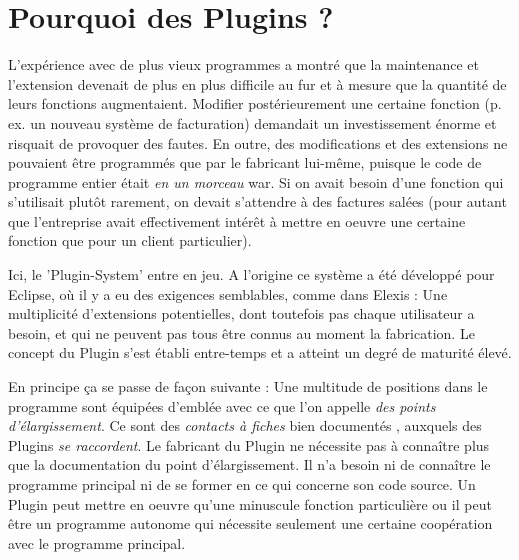 
\section{Pourquoi des Plugins ?}
\label{expl:plugins}
L'expérience avec de plus vieux programmes a montré que la maintenance et l'extension devenait de plus en plus difficile au fur et à mesure que la quantité de leurs fonctions augmentaient. Modifier postérieurement une certaine fonction (p. ex. un nouveau système de facturation) demandait un investissement énorme et risquait de provoquer des fautes.
En outre, des modifications et des extensions ne pouvaient être programmés que par le fabricant lui-même, puisque le code de programme entier était \textit{en un morceau} war. Si on avait besoin d'une fonction qui s'utilisait plutôt rarement, on devait s'attendre à des factures salées (pour autant que l'entreprise avait effectivement intérêt à mettre en oeuvre une certaine fonction que pour un client particulier).

Ici, le 'Plugin-System' entre en jeu. A l'origine ce système a été développé pour Eclipse, où il y a eu des exigences semblables, comme dans Elexis : Une multiplicité d'extensions potentielles, dont toutefois pas chaque utilisateur a besoin, et qui ne peuvent pas tous être connus au moment la fabrication. Le concept du Plugin s'est établi entre-temps et a atteint un degré de maturité élevé.

En principe ça se passe de façon suivante : Une multitude de positions dans le programme sont équipées d'emblée avec ce que l'on appelle  \textit{des points d'élargissement}. Ce sont des \textit{contacts à fiches } bien documentés , auxquels  des Plugins \textit{se raccordent}. Le fabricant du Plugin ne nécessite pas à connaître plus que la documentation du point d'élargissement.
Il n'a besoin ni de connaître le programme principal ni de se former en ce qui concerne son code source. Un Plugin peut mettre en oeuvre qu'une minuscule fonction particulière ou il peut être un programme autonome qui nécessite seulement une certaine coopération avec le programme principal.


